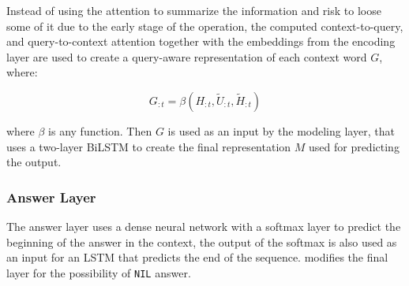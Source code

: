 

Instead of using the attention to summarize the information and risk to loose some of it due to the early stage of the operation, the computed context-to-query, and query-to-context attention together with the embeddings from the encoding layer are used to create a query-aware representation of each context word $G$, where:

\begin{equation}
    G_{:t} = \beta(H_{:t}, \tilde{U}_{:t}, \tilde{H}_{:t})
\end{equation}

where $\beta$ is any function. Then $G$ is used as an input by the modeling layer, that uses a two-layer BiLSTM to create the final representation $M$ used for predicting the output.


\subsubsection{Answer Layer}
The answer layer uses a dense neural network with a softmax layer to predict the beginning of the answer in the context, the output of the softmax is also used as an input for an LSTM that predicts the end of the sequence. \cite{levy2017zero} modifies the final layer for the possibility of \texttt{NIL} answer.

